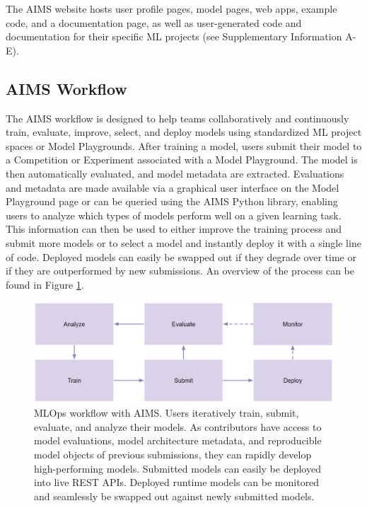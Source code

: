 The AIMS website hosts user profile pages, model pages, web apps, example code, and a documentation page, as well as user-generated code and documentation for their specific ML projects (see Supplementary Information A-E). 


\subsection{AIMS Workflow}
The AIMS workflow is designed to help teams collaboratively and continuously train, evaluate, improve, select, and deploy models using standardized ML project spaces or Model Playgrounds. After training a model, users submit their model to a Competition or Experiment associated with a Model Playground. The model is then automatically evaluated, and model metadata are extracted. Evaluations and metadata are made available via a graphical user interface on the Model Playground page or can be queried using the AIMS Python library, enabling users to analyze which types of models perform well on a given learning task. This information can then be used to either improve the training process and submit more models or to select a model and instantly deploy it with a single line of code. Deployed models can easily be swapped out if they degrade over time or if they are outperformed by new submissions. An overview of the process can be found in Figure \ref{fig:fig_aims_workflow}.


\begin{figure}
  \centering
  \includegraphics[width=1\textwidth]{figures/fig_aims_workflow.png}
  \caption{MLOps workflow with AIMS. Users iteratively train, submit, evaluate, and analyze their models. As contributors have access to model evaluations, model architecture metadata, and reproducible model objects of previous submissions, they can rapidly develop high-performing models. Submitted models can easily be deployed into live REST APIs. Deployed runtime models can be monitored and seamlessly be swapped out against newly submitted models.}
  \label{fig:fig_aims_workflow}
\end{figure}


